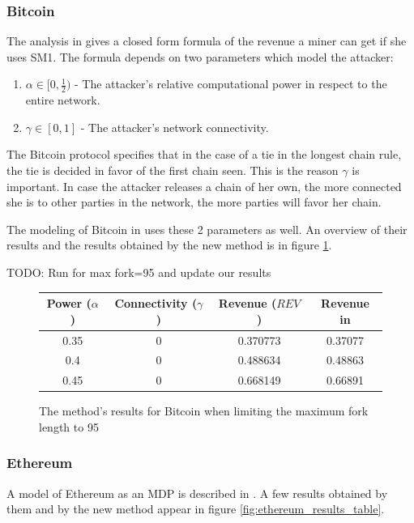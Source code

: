 \documentclass{article}
\newcommand{\rev}{\textit{REV}}
\begin{document}
\subsubsection{Bitcoin}

The analysis in \cite{eyalmajority} gives a closed form formula of the revenue a miner can get if she uses SM1. The formula depends on two parameters which model the attacker:
\begin{enumerate}
    \item $\alpha \in [0, \frac{1}{2})$ - The attacker's relative computational power in respect to the entire network.
    \item $\gamma \in [0, 1]$ - The attacker's network connectivity.
\end{enumerate}
The Bitcoin protocol specifies that in the case of a tie in the longest chain rule, the tie is decided in favor of the first chain seen. This is the reason $\gamma$ is important. In case the attacker releases a chain of her own, the more connected she is to other parties in the network, the more parties will favor her chain.

The modeling of Bitcoin in \cite{sapirshtein2016optimal} uses these 2 parameters as well. An overview of their results and the results obtained by the new method is in figure \ref{fig:bitcoin_results_table}.

TODO: Run for max fork=95 and update our results
\begin{figure}[H]
	\centering
	\begin{tabular}{ |c|c|c|c| } 
		 \hline
		 Power ($\alpha$) & Connectivity ($\gamma$) & Revenue ($\rev$) & Revenue in \cite{sapirshtein2016optimal}\\
		 \hline
		 0.35 & 0 & 0.370773 & 0.37077\\
		 \hline
		 0.4 & 0 & 0.488634 & 0.48863\\
		 \hline
		 0.45 & 0 & 0.668149 & 0.66891\\
		 \hline
	\end{tabular}
	\caption{The method's results for Bitcoin when limiting the maximum fork length to 95}
	\label{fig:bitcoin_results_table}
\end{figure}

\subsubsection{Ethereum}
A model of Ethereum as an MDP is described in \cite{hou2019squirrl}. A few results obtained by them and by the new method appear in figure \ref{fig:ethereum_results_table}.
\end{document}
